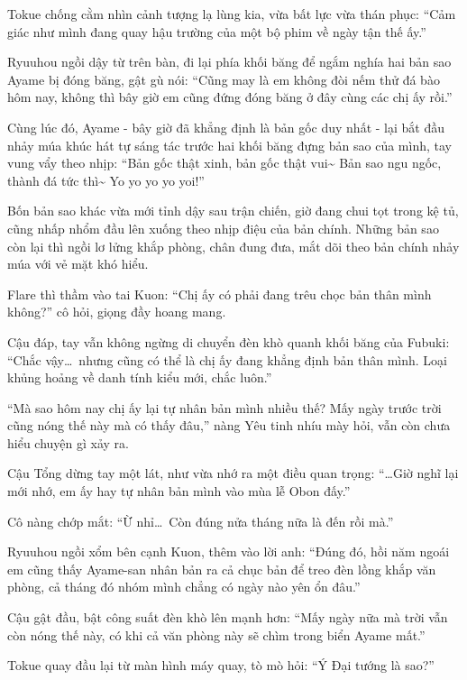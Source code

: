 \documentclass[../main.tex]{subfiles}
\begin{document}
Tokue chống cằm nhìn cảnh tượng lạ lùng kia, vừa bất lực vừa thán phục: ``Cảm giác như mình đang quay hậu trường của một bộ phim về ngày tận thế ấy.''

Ryuuhou ngồi dậy từ trên bàn, đi lại phía khối băng để ngắm nghía hai bản sao Ayame bị đóng băng, gật gù nói: ``Cũng may là em không đòi nếm thử đá bào hôm nay, không thì bây giờ em cũng đứng đóng băng ở đây cùng các chị ấy rồi.''

Cùng lúc đó, Ayame - bây giờ đã khẳng định là bản gốc duy nhất - lại bắt đầu nhảy múa khúc hát tự sáng tác trước hai khối băng đựng bản sao của mình, tay vung vẩy theo nhịp: ``Bản gốc thật xinh, bản gốc thật vui\~{} Bản sao ngu ngốc, thành đá tức thì\~{} Yo yo yo yo yoi!''


Bốn bản sao khác vừa mới tỉnh dậy sau trận chiến, giờ đang chui tọt trong kệ tủ, cũng nhấp nhổm đầu lên xuống theo nhịp điệu của bản chính. Những bản sao còn lại thì ngồi lơ lửng khắp phòng, chân đung đưa, mắt dõi theo bản chính nhảy múa với vẻ mặt khó hiểu.

Flare thì thầm vào tai Kuon: ``Chị ấy có phải đang trêu chọc bản thân mình không?'' cô hỏi, giọng đầy hoang mang.

Cậu đáp, tay vẫn không ngừng di chuyển đèn khò quanh khối băng của Fubuki: ``Chắc vậy\dots\ nhưng cũng có thể là chị ấy đang khẳng định bản thân mình. Loại khủng hoảng về danh tính kiểu mới, chắc luôn.''

``Mà sao hôm nay chị ấy lại tự nhân bản mình nhiều thế? Mấy ngày trước trời cũng nóng thế này mà có thấy đâu,'' nàng Yêu tinh nhíu mày hỏi, vẫn còn chưa hiểu chuyện gì xảy ra.

Cậu Tổng dừng tay một lát, như vừa nhớ ra một điều quan trọng: ``\dots Giờ nghĩ lại mới nhớ, em ấy hay tự nhân bản mình vào mùa lễ Obon đấy.''

Cô nàng chớp mắt: ``Ừ nhỉ\dots\ Còn đúng nửa tháng nữa là đến rồi mà.''

Ryuuhou ngồi xổm bên cạnh Kuon, thêm vào lời anh: ``Đúng đó, hồi năm ngoái em cũng thấy Ayame-san nhân bản ra cả chục bản để treo đèn lồng khắp văn phòng, cả tháng đó nhóm mình chẳng có ngày nào yên ổn đâu.''

Cậu gật đầu, bật công suất đèn khò lên mạnh hơn: ``Mấy ngày nữa mà trời vẫn còn nóng thế này, có khi cả văn phòng này sẽ chìm trong biển Ayame mất.''

Tokue quay đầu lại từ màn hình máy quay, tò mò hỏi: ``Ý Đại tướng là sao?''
\end{document}
